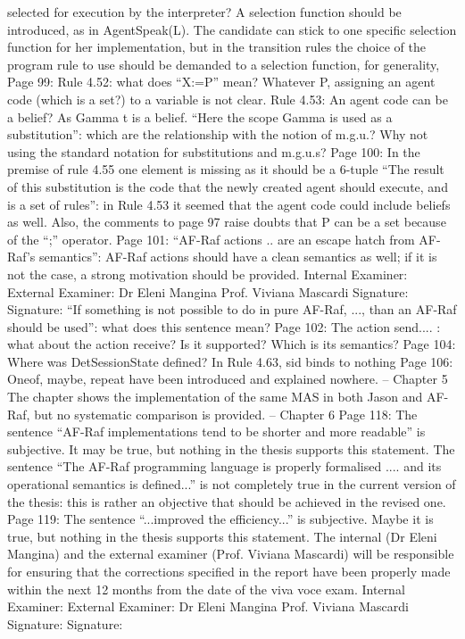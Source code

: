 \documentclass{article}
\newenvironment{them}{\noindent\begingroup\color{blue}}{\endgroup\par}
\begin{document}
\begin{them}
selected for execution by the interpreter? A selection function should be introduced, as in
AgentSpeak(L). The candidate can stick to one specific selection function for her implementation, but
in the transition rules the choice of the program rule to use should be demanded to a selection
function, for generality,
Page 99:
Rule 4.52: what does “X:=P” mean? Whatever P, assigning an agent code (which is a set?) to a
variable is not clear.
Rule 4.53:
An agent code can be a belief? As Gamma t is a belief.
“Here the scope Gamma is used as a substitution”: which are the relationship with the notion of
m.g.u.? Why not using the standard notation for substitutions and m.g.u.s?
Page 100:
In the premise of rule 4.55 one element is missing as it should be a 6-tuple
“The result of this substitution is the code that the newly created agent should execute, and is a set
of rules”: in Rule 4.53 it seemed that the agent code could include beliefs as well. Also, the
comments to page 97 raise doubts that P can be a set because of the “;” operator.
Page 101:
“AF-Raf actions .. are an escape hatch from AF-Raf's semantics”: AF-Raf actions should have a clean
semantics as well; if it is not the case, a strong motivation should be provided.
Internal Examiner: External Examiner:
Dr Eleni Mangina Prof. Viviana Mascardi
Signature: Signature:
“If something is not possible to do in pure AF-Raf, ..., than an AF-Raf should be used”: what does this
sentence mean?
Page 102:
The action send.... : what about the action receive? Is it supported? Which is its semantics?
Page 104:
Where was DetSessionState defined?
In Rule 4.63, sid binds to nothing
Page 106:
Oneof, maybe, repeat have been introduced and explained nowhere.
-- Chapter 5
The chapter shows the implementation of the same MAS in both Jason and AF-Raf, but no systematic
comparison is provided.
-- Chapter 6
Page 118:
The sentence “AF-Raf implementations tend to be shorter and more readable” is subjective. It may
be true, but nothing in the thesis supports this statement.
The sentence “The AF-Raf programming language is properly formalised .... and its operational
semantics is defined...” is not completely true in the current version of the thesis: this is rather an
objective that should be achieved in the revised one.
Page 119:
The sentence “...improved the efficiency...” is subjective. Maybe it is true, but nothing in the thesis
supports this statement.
The internal (Dr Eleni Mangina) and the external examiner (Prof. Viviana Mascardi) will be
responsible for ensuring that the corrections specified in the report have been properly made
within the next 12 months from the date of the viva voce exam.
Internal Examiner: External Examiner:
Dr Eleni Mangina Prof. Viviana Mascardi
Signature: Signature:
\end{document}
